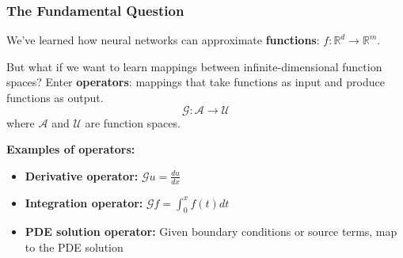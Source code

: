 \documentclass[notes]{beamer}
\begin{document}
\begin{frame}
\frametitle{The Fundamental Question}

We've learned how neural networks can approximate \textbf{functions}: $f: \mathbb{R}^d \rightarrow \mathbb{R}^m$.

\vspace{1cm}

\begin{alertblock}{But what if we want to learn mappings between infinite-dimensional function spaces?}
Enter \textbf{operators}: mappings that take functions as input and produce functions as output.
\begin{equation*}
\mathcal{G}: \mathcal{A} \rightarrow \mathcal{U}
\end{equation*}
where $\mathcal{A}$ and $\mathcal{U}$ are function spaces.
\end{alertblock}

\textbf{Examples of operators:}
\begin{itemize}
    \item \textbf{Derivative operator:} $\mathcal{G}u = \frac{du}{dx}$
    \item \textbf{Integration operator:} $\mathcal{G}f = \int_0^x f(t) dt$
    \item \textbf{PDE solution operator:} Given boundary conditions or source terms, map to the PDE solution
\end{itemize}

\end{frame}
\end{document}
